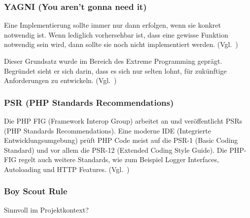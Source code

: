 \subsubsection{YAGNI (You aren't gonna need it)}
Eine Implementierung sollte immer nur dann erfolgen, wenn sie konkret notwendig ist.
Wenn lediglich vorhersehbar ist, dass eine gewisse Funktion notwendig sein wird, dann sollte sie noch nicht implementiert werden.
(Vgl.~\cite{extreme-programming-installed})

Dieser Grundsatz wurde im Bereich des Extreme Programming geprägt.
Begründet sieht er sich darin, dass es sich nur selten lohnt, für zukünftige Anforderungen zu entwickeln.
(Vgl.~\cite{kiss-principle-explained})

\subsubsection{PSR (PHP Standards Recommendations)}
Die PHP FIG (Framework Interop Group) arbeitet an und veröffentlicht PSRs (PHP Standards Recommendations).
Eine moderne IDE (Integrierte Entwicklungsumgebung) prüft PHP Code meist auf die PSR-1 (Basic Coding Standard) und vor allem die PSR-12 (Extended Coding Style Guide).
Die PHP-FIG regelt auch weitere Standards, wie zum Beispiel Logger Interfaces, Autoloading und HTTP Features.
(Vgl.~\cite{psr})

\subsubsection{Boy Scout Rule}
Sinnvoll im Projektkontext?
